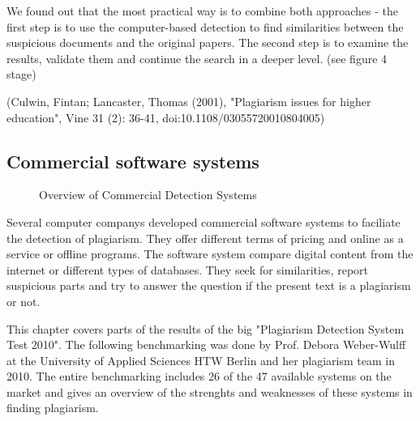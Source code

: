We found out that the most practical way is to combine both approaches - the first step is to use the computer-based detection to find similarities between the suspicious documents and the original papers. The second step is to examine the results, validate them and continue the search in a deeper level. (see figure 4 stage)



(Culwin, Fintan; Lancaster, Thomas (2001), "Plagiarism issues for higher education", Vine 31 (2): 36-41, doi:10.1108/03055720010804005)

\newpage
\subsection{Commercial software systems} 

 
 \begin{figure}[!h]
  \centering
  \caption{Overview of Commercial Detection Systems}
  \label{fig:overview_systems}
\end{figure}



Several computer companys developed commercial software systems to faciliate the detection of plagiarism. They offer different terms of pricing and online as a service or offline programs. 
The software system compare digital content from the internet or different types of databases. 
They seek for similarities, report suspicious parts and try to answer the question if the present text is a plagiarism or not.

This chapter covers parts of the results of the big "Plagiarism Detection System Test 2010". 
The following benchmarking was done by Prof. Debora Weber-Wulff at the University of Applied Sciences HTW Berlin and her plagiarism team in 2010. 
The entire benchmarking includes 26 of the 47 available systems on the market and gives an overview of the strenghts and weaknesses of these systems in finding plagiarism.

